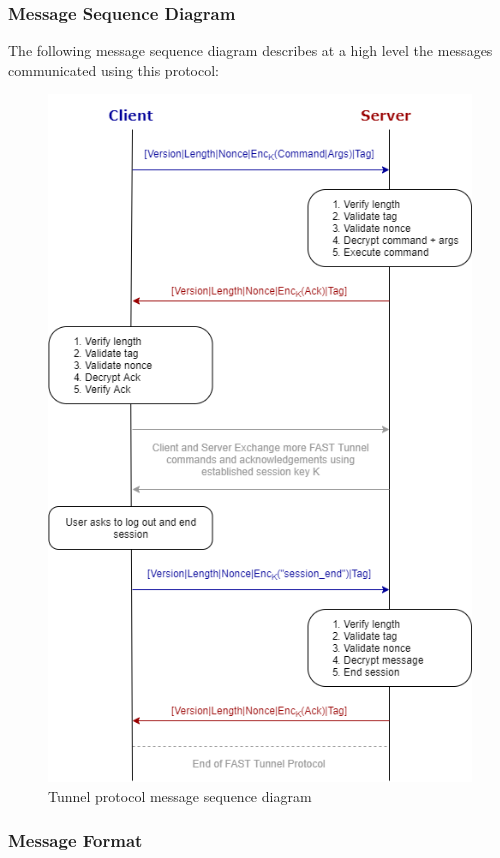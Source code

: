 \documentclass[12pt]{article}
\begin{document}
\subsubsection{Message Sequence Diagram}

The following message sequence diagram describes at a high level the messages communicated using this protocol:
\newpage
\begin{figure}[H]
    \centering
    \includegraphics[scale=0.64]{Tunnel_MSC}
    \caption{Tunnel protocol message sequence diagram}
    \label{fig:tunnel_msc}
\end{figure}
\newpage

\subsubsection{Message Format}
\end{document}
